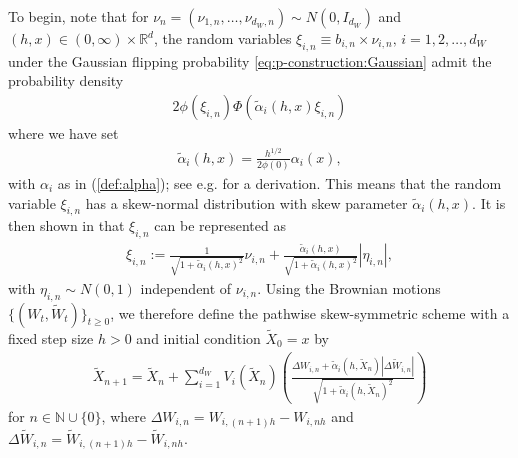 \documentclass[11pt]{article}
\begin{document}
To begin, note that for $\nu_n = (\nu_{1, n}, \ldots, \nu_{d_W, n}) \sim N(0,I_{d_W})$ and $(h, x) \in (0, \infty) \times \mathbb{R}^d$, the random variables $\xi_{i, n} \equiv b_{i, n}  \times \nu_{i, n}, \, i = 1, 2, \ldots, d_W$ under the Gaussian flipping probability \eqref{eq:p-construction:Gaussian} admit the probability density
% 
\begin{align}
2 \phi (\xi_{i, n}) \Phi (\tilde{\alpha}_i (h, x) \xi_{i, n}) 
\end{align} 
%
where we have set
\begin{align} \label{eq:skewness}
\tilde{\alpha}_i (h,x) = \frac{h^{1/2}}{2 \phi(0)} \alpha_i (x), 
\end{align} 
with $\alpha_i$ as in (\ref{def:alpha}); see e.g. \cite{Hen:86} for a derivation.
% 
% 
This means that the random variable $\xi_{i, n}$ has a skew-normal distribution with skew parameter $\tilde{\alpha}_i (h,x)$. It is then shown in \cite{Hen:86} that $\xi_{i, n}$ can be represented as 
% 
\begin{align}
\xi_{i, n} := \frac{1}{\sqrt{1 + \tilde{\alpha}_{i} (h,x)^2}} \nu_{i, n} 
+ \frac{\tilde{\alpha}_i (h, x)}{\sqrt{1 + \tilde{\alpha}_i (h,x)^2}} |\eta_{i,n}|,  
\end{align} 
% 
with $\eta_{i,n} \sim N(0,1)$ independent of $\nu_{i,n}$. Using the Brownian motions $\{(W_t, \widetilde{W}_t)\}_{t \ge 0}$, we therefore define the pathwise skew-symmetric scheme with a fixed step size $h > 0$ and initial condition $\widetilde X_0=x$ by
% 
\begin{align} \label{eq:pathwise_ss}
\widetilde{X}_{n+1} = \widetilde{X}_{n} + \sum_{i = 1}^{d_W} 
{V}_{i} (\widetilde{X}_{n}) 
\left( \frac{\Delta W_{i, n} + \tilde{\alpha}_i (h, \widetilde{X}_{n})| \Delta \widetilde{W}_{i, n} | }{\sqrt{1 + \tilde{\alpha}_i (h, \widetilde{X}_{n})^2}}  \right)
\end{align}  
for $n \in \mathbb{N} \cup \{0\}$, 
where $\Delta{W}_{i, n} = W_{i, (n+1)h} - W_{i, nh}$ and $\Delta \widetilde{W}_{i, n} = \widetilde{W}_{i, (n+1)h} - \widetilde{W}_{i, nh}$. 
% 
\end{document}
